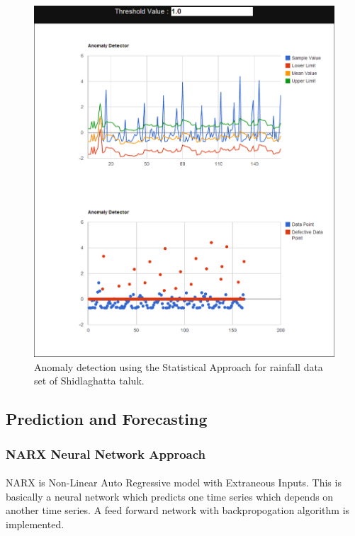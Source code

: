 \documentclass[12pt,a4paper]{report}
\begin{document}
\begin{figure}[h!]

  \centering
    \includegraphics[scale=0.5]{./screenshots/result_ano_stat_Sid.png}
  \caption{Anomaly detection using the Statistical Approach for rainfall data set of Shidlaghatta taluk.}
\end{figure}

\subsection{Prediction and Forecasting}
\subsubsection{NARX Neural Network Approach}
\paragraph{} NARX is Non-Linear Auto Regressive model with Extraneous Inputs. This is basically a neural network which predicts one time series which depends on another time series. A feed forward network with backpropogation algorithm is implemented. 
\end{document}
